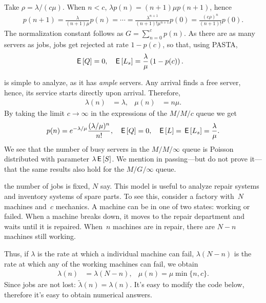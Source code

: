 \documentclass[stochastic-or.tex]{subfiles}
\begin{document}
Take $\rho = \lambda/(c \mu)$. When $n<c$, $\lambda p(n) = (n+1)\mu p(n+1)$, hence
 \begin{align*}
   p(n+1) = \frac{\lambda}{(n+1)\mu }p(n) = \cdots = \frac{\lambda^{n+1}}{(n+1)!\mu^{n+1}} p(0) = \frac{(c\rho)^{n}}{(n+1)!} p(0).
\end{align*}
The normalization constant follows  as $G = \sum_{n=0}^{c}p(n)$. As there are as many servers as jobs, jobs get rejected at rate $1-p(c)$, so that, using PASTA,
 \begin{align*}
   \,\mathsf{E}\left[Q\right] &= 0, & \,\mathsf{E}\left[L_s\right] &= \frac{\lambda}{\mu} \left(1- p(c)\right).
\end{align*}


 is simple to analyze, as it has \emph{ample} servers.
Any arrival finds a free server, hence, its service  starts directly upon arrival.
Therefore,
\begin{align*}
\lambda(n)&=\lambda, & \mu(n) &= n \mu.
\end{align*}
By taking the limit $c\to \infty$ in the expressions of the $M/M/c$ queue we get
\begin{align*}
  p(n) &= e^{-\lambda/\mu} \frac{(\lambda/\mu)^n}{n!}, & \,\mathsf{E}\left[Q\right]&=0, & \,\mathsf{E}\left[L\right] = \,\mathsf{E}\left[L_s\right] = \frac \lambda \mu.
\end{align*}
We see that the number of busy servers in the $M/M/\infty$ queue is Poisson distributed with parameter $\lambda \,\mathsf{E}\left[S\right]$.
We mention in passing---but do not prove it---that the same results also hold for the $M/G/\infty$ queue.

 the number of jobs is fixed, $N$ say.
This model is useful to analyze repair systems and inventory systems of spare parts.
To see this, consider a factory with~$N$ machines and~$c$ mechanics.
A machine can be in one of two states: working or failed.
When a machine breaks down, it moves to the repair department and waits until it is repaired.
When~$n$ machines are in repair, there are $N-n$ machines still working.

Thus, if $\lambda$ is the rate at which a individual machine can fail, $\lambda(N-n)$ is the rate at which any of the working machines can fail,
we obtain
\begin{align*}
  \lambda(n) &= \lambda (N-n), & \mu(n) = \mu \min\{n, c\}.
\end{align*}
Since jobs are not lost: $\tilde \lambda(n) = \lambda(n)$.
It's easy to modify the code below, therefore it's easy to obtain numerical answers.
\end{document}

